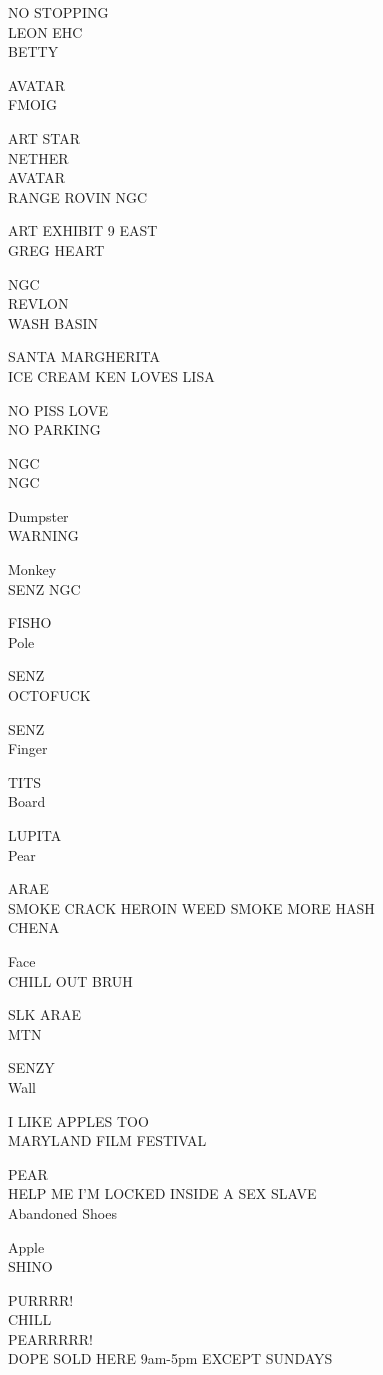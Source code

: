 \documentclass[10pt,letterpaper]{article}
\begin{document}
NO STOPPING\\
LEON EHC\\
BETTY

AVATAR\\
FMOIG

ART STAR\\
NETHER\\
AVATAR\\
RANGE ROVIN NGC

ART EXHIBIT 9 EAST\\
GREG HEART

NGC\\
REVLON\\
WASH BASIN

SANTA MARGHERITA\\
ICE CREAM KEN LOVES LISA

NO PISS LOVE\\
NO PARKING

NGC\\
NGC

Dumpster\\
WARNING

Monkey\\
SENZ NGC

FISHO\\
Pole

SENZ\\
OCTOFUCK

SENZ\\
Finger

TITS\\
Board

LUPITA\\
Pear

ARAE\\
SMOKE CRACK HEROIN WEED SMOKE MORE HASH\\
CHENA

Face\\
CHILL OUT BRUH

SLK ARAE\\
MTN

SENZY\\
Wall

I LIKE APPLES TOO\\
MARYLAND FILM FESTIVAL

PEAR\\
HELP ME I'M LOCKED INSIDE A SEX SLAVE\\
Abandoned Shoes

Apple\\
SHINO

PURRRR!\\
CHILL\\
PEARRRRR!\\
DOPE SOLD HERE 9am{-}5pm EXCEPT SUNDAYS
\end{document}
